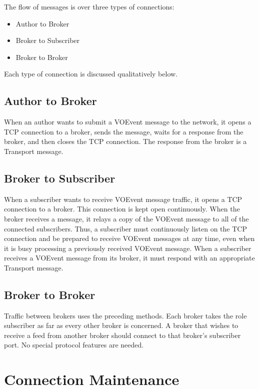 \documentclass[a4paper,11pt]{ivoa}
\begin{document}
The flow of messages is over three types of connections:

\begin{itemize}
    \item{Author to Broker}
    \item{Broker to Subscriber}
    \item{Broker to Broker}
\end{itemize}

Each type of connection is discussed qualitatively below.

\subsection{Author to Broker}

When an author wants to submit a VOEvent message to the network, it opens a
TCP connection to a broker, sends the message, waits for a response from the
broker, and then closes the TCP connection. The response from the broker is a
Transport message.

\subsection{Broker to Subscriber}

When a subscriber wants to receive VOEvent message traffic, it opens a TCP
connection to a broker. This connection is kept open continuously. When the
broker receives a message, it relays a copy of the VOEvent message to all of
the connected subscribers. Thus, a subscriber must continuously listen on the
TCP connection and be prepared to receive VOEvent messages at any time, even
when it is busy processing a previously received VOEvent message. When a
subscriber receives a VOEvent message from its broker, it must respond with an
appropriate Transport message.

\subsection{Broker to Broker}
\label{sec:node:brokertobroker}

Traffic between brokers uses the preceding methods. Each broker takes the role
subscriber as far as every other broker is concerned. A broker that wishes to
receive a feed from another broker should connect to that broker's subscriber
port. No special protocol features are needed.

\section{Connection Maintenance}
\label{sec:maintenance}
\end{document}
